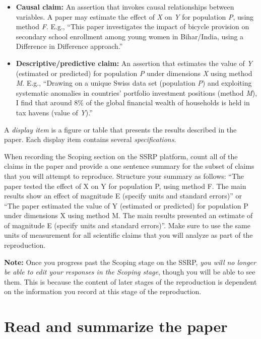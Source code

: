 \documentclass[
]{book}
\begin{document}
\begin{itemize}
\item
  \textbf{Causal claim:} An assertion that invokes causal relationships between variables. A paper may estimate the effect of \emph{X} on \emph{Y} for population \emph{P}, using method \emph{F}. E.g., ``This paper investigates the impact of bicycle provision on secondary school enrollment among young women in Bihar/India, using a Difference in Difference approach.''
\item
  \textbf{Descriptive/predictive claim:} An assertion that estimates the value of \emph{Y} (estimated or predicted) for population \emph{P} under dimensions \emph{X} using method \emph{M}. E.g., ``Drawing on a unique Swiss data set (population \emph{P}) and exploiting systematic anomalies in countries' portfolio investment positions (method \emph{M}), I find that around 8\% of the global financial wealth of households is held in tax havens (value of \emph{Y}).''
\end{itemize}

A \emph{display item} is a figure or table that presents the results described in the paper. Each display item contains several \emph{specifications}.

When recording the Scoping section on the SSRP platform, count all of the claims in the paper and provide a one sentence summary for the subset of claims that you will attempt to reproduce. Structure your summary as follows: ``The paper tested the effect of X on Y for population P, using method F. The main results show an effect of magnitude E (specify units and standard errors)'' or ``The paper estimated the value of Y (estimated or predicted) for population P under dimensions X using method M. The main results presented an estimate of of magnitude E (specify units and standard errors)''. Make sure to use the same units of measurement for all scientific claims that you will analyze as part of the reproduction.

\textbf{Note:} Once you progress past the Scoping stage on the SSRP, \emph{you will no longer be able to edit your responses in the Scoping stage}, though you will be able to see them. This is because the content of later stages of the reproduction is dependent on the information you record at this stage of the reproduction.

\hypertarget{read-sum}{%
\section{Read and summarize the paper}\label{read-sum}}
\end{document}
